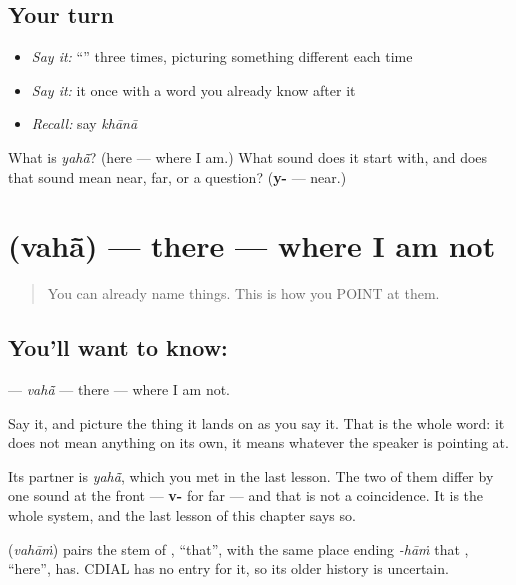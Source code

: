 \subsection*{Your turn}
\begin{itemize}
\raggedright
  \item \emph{Say it:} \textquotedblleft{}\textquotedblright{} three times, picturing something different each time
  \item \emph{Say it:} it once with a word you already know after it
  \item \emph{Recall:} say \emph{khānā}
\end{itemize}

\begin{tcolorbox}[breakable,colback=teal!4,colframe=teal!35!black,title={Before you move on}]
What is \emph{yahā̃}? (here — where I am.) What sound does it start with, and does that sound mean near, far, or a question? (\textbf{y-} — near.)
\end{tcolorbox}
\section[\texorpdfstring{\hi{वहाँ} (vahā̃)}{वहाँ (vahā̃)}]{ (vahā̃) — there — where I am not}

\label{lesson:HI-C40-there}



\begin{quote}
You can already name things. This is how you POINT at them.
\end{quote}

\subsection*{You'll want to know: }
\textbf{} — \emph{vahā̃} — there — where I am not.

Say it, and picture the thing it lands on as you say it. That is the whole word: it does not mean anything on its own, it means whatever the speaker is pointing at.

Its partner is \textbf{} \emph{yahā̃}, which you met in the last lesson. The two of them differ by one sound at the front — \textbf{v-} for far — and that is not a coincidence. It is the whole system, and the last lesson of this chapter says so.

\begin{cousinweb}
\textbf{} (\emph{vahāṁ}) pairs the stem of \textbf{}, \textquotedblleft{}that\textquotedblright{}, with the same place ending \emph{-hāṁ} that \textbf{}, \textquotedblleft{}here\textquotedblright{}, has. CDIAL has no entry for it, so its older history is uncertain.
\end{cousinweb}

